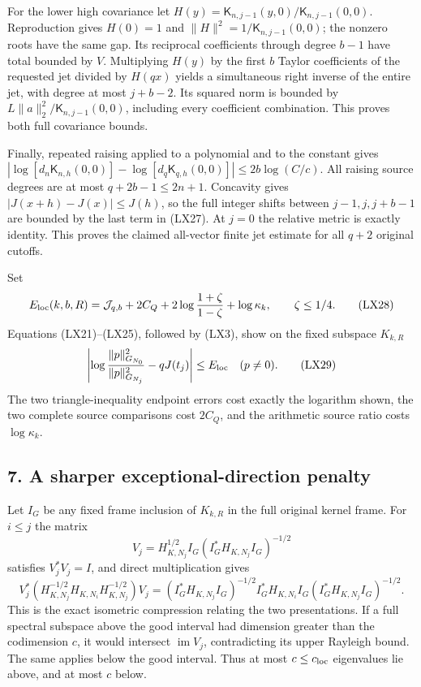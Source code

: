 \documentclass[10pt]{article}
\begin{document}
For the lower high covariance let \(H(y)=\mathsf K_{n,j-1}(y,0)/\mathsf K_{n,j-1}(0,0)\). Reproduction gives \(H(0)=1\) and \(\|H\|^2=1/\mathsf K_{n,j-1}(0,0)\); the nonzero roots have the same gap. Its reciprocal coefficients through degree \(b-1\) have total bounded by \(V\). Multiplying \(H(y)\) by the first \(b\) Taylor coefficients of the requested jet divided by \(H(qx)\) yields a simultaneous right inverse of the entire jet, with degree at most \(j+b-2\). Its squared norm is bounded by \(L\|a\|_2^2/\mathsf K_{n,j-1}(0,0)\), including every coefficient combination. This proves both full covariance bounds.

Finally, repeated raising applied to a polynomial and to the constant gives \(|\log[d_n\mathsf K_{n,h}(0,0)]-\log[d_q\mathsf K_{q,h}(0,0)]|\le2b\log(C/c)\). All raising source degrees are at most \(q+2b-1\le2n+1\). Concavity gives \(|J(x+h)-J(x)|\le J(h)\), so the full integer shifts between \(j-1,j,j+b-1\) are bounded by the last term in (LX27). At \(j=0\) the relative metric is exactly identity. This proves the claimed all-vector finite jet estimate for all \(q+2\) original cutoffs.

Set \[
E_{\rm loc}(k,b,R)=\mathcal J_{q,b}+2C_Q
+2\log\frac{1+\zeta}{1-\zeta}+\log\kappa_k,
\qquad\zeta\le1/4.
\tag{LX28}
\] Equations (LX21)--(LX25), followed by (LX3), show on the fixed subspace \(K_{k,R}\) \[
\left|\log\frac{\|p\|_{G_{N_0}}^2}{\|p\|_{G_{N_j}}^2}-qJ(t_j)\right|
\le E_{\rm loc}\quad(p\ne0).
\tag{LX29}
\] The two triangle-inequality endpoint errors cost exactly the logarithm shown, the two complete source comparisons cost \(2C_Q\), and the arithmetic source ratio costs \(\log\kappa_k\).

\subsection{7. A sharper exceptional-direction penalty}\label{a-sharper-exceptional-direction-penalty}

Let \(I_G\) be any fixed frame inclusion of \(K_{k,R}\) in the full original kernel frame. For \(i\le j\) the matrix \[
V_j=H_{K,N_j}^{1/2}I_G(I_G^*H_{K,N_j}I_G)^{-1/2}
\] satisfies \(V_j^*V_j=I\), and direct multiplication gives \[
V_j^*(H_{K,N_j}^{-1/2}H_{K,N_i}H_{K,N_j}^{-1/2})V_j
=(I_G^*H_{K,N_j}I_G)^{-1/2}I_G^*H_{K,N_i}I_G
(I_G^*H_{K,N_j}I_G)^{-1/2}.
\tag{LX30}
\] This is the exact isometric compression relating the two presentations. If a full spectral subspace above the good interval had dimension greater than the codimension \(c\), it would intersect \(\operatorname{im}V_j\), contradicting its upper Rayleigh bound. The same applies below the good interval. Thus at most \(c\le c_{\rm loc}\) eigenvalues lie above, and at most \(c\) below.
\end{document}
